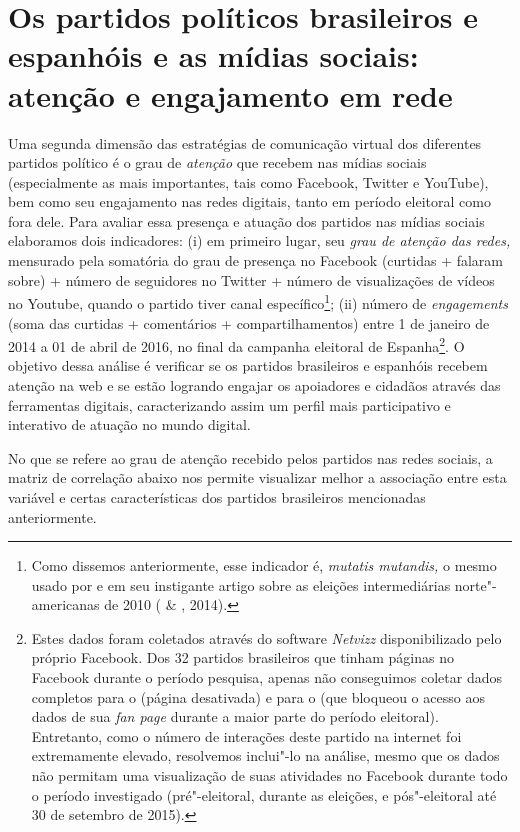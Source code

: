 \section{Os partidos políticos brasileiros e espanhóis e as mídias sociais:
atenção e engajamento em rede}

Uma segunda dimensão das estratégias de comunicação virtual dos
diferentes partidos político é o grau de \emph{atenção} que recebem nas
mídias sociais (especialmente as mais importantes, tais como Facebook,
Twitter e YouTube), bem como seu engajamento nas redes digitais, tanto
em período eleitoral como fora dele. Para avaliar essa presença e
atuação dos partidos nas mídias sociais elaboramos dois indicadores: (i)
em primeiro lugar, seu \emph{grau de atenção das redes,} mensurado pela
somatória do grau de presença no Facebook (curtidas + falaram sobre) +
número de seguidores no Twitter + número de visualizações de vídeos no
Youtube, quando o partido tiver canal específico\footnote{Como dissemos
  anteriormente, esse indicador é, \emph{mutatis mutandis,} o mesmo
  usado por  e  em seu instigante artigo sobre as eleições
  intermediárias norte"-americanas de 2010 ( \& , 2014).};
(ii) número de \emph{engagements} (soma das curtidas + comentários +
compartilhamentos) entre 1 de janeiro de 2014 a 01 de abril de 2016, no
final da campanha eleitoral de Espanha\footnote{Estes dados foram
  coletados através do software \emph{Netvizz} disponibilizado pelo
  próprio Facebook. Dos 32 partidos brasileiros que tinham páginas no
  Facebook durante o período pesquisa, apenas não conseguimos coletar
  dados completos para o  (página desativada) e para o  (que
  bloqueou o acesso aos dados de sua \emph{fan page} durante a maior
  parte do período eleitoral). Entretanto, como o número de interações
  deste partido na internet foi extremamente elevado, resolvemos
  inclui"-lo na análise, mesmo que os dados não permitam uma visualização
  de suas atividades no Facebook durante todo o período investigado
  (pré"-eleitoral, durante as eleições, e pós"-eleitoral até 30 de
  setembro de 2015).}. O objetivo dessa análise é verificar se os
partidos brasileiros e espanhóis recebem atenção na web e se estão
logrando engajar os apoiadores e cidadãos através das ferramentas
digitais, caracterizando assim um perfil mais participativo e interativo
de atuação no mundo digital.

No que se refere ao grau de atenção recebido pelos partidos nas redes
sociais, a matriz de correlação abaixo nos permite visualizar melhor a
associação entre esta variável e certas características dos partidos
brasileiros mencionadas anteriormente.

